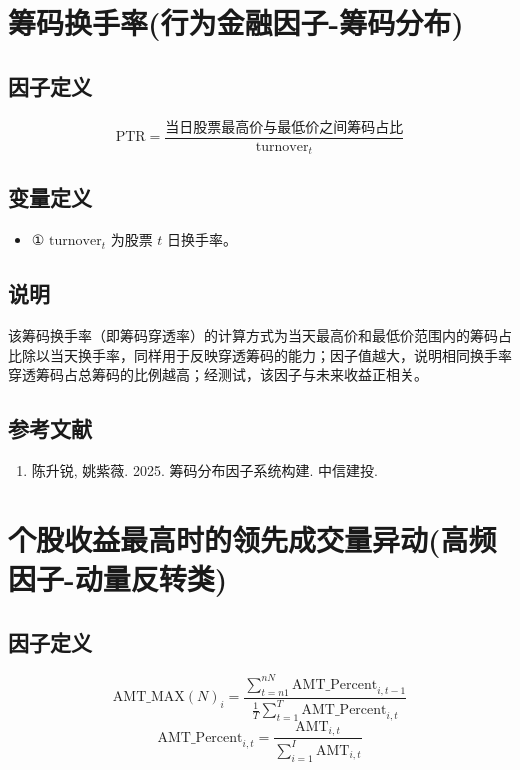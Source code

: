 \documentclass{article}
\begin{document}
\section{筹码换手率(行为金融因子-筹码分布)}

\subsection{因子定义}
\begin{equation}
    \mathrm{PTR} = \frac{\text{当日股票最高价与最低价之间筹码占比}}{\mathrm{turnover}_t}
\end{equation}

\subsection{变量定义}
\begin{itemize}
    \item ① \( \mathrm{turnover}_t \) 为股票 \( t \) 日换手率。
\end{itemize}

\subsection{说明}
该筹码换手率（即筹码穿透率）的计算方式为当天最高价和最低价范围内的筹码占比除以当天换手率，同样用于反映穿透筹码的能力；因子值越大，说明相同换手率穿透筹码占总筹码的比例越高；经测试，该因子与未来收益正相关。

\subsection{参考文献}
\begin{enumerate}
    \item 陈升锐, 姚紫薇. 2025. 筹码分布因子系统构建. 中信建投.
\end{enumerate}

\section{个股收益最高时的领先成交量异动(高频因子-动量反转类)}

\subsection{因子定义}

\begin{equation}
    \mathrm{AMT\_MAX}(N)_i = \frac{\sum_{t=n1}^{nN} \mathrm{AMT\_Percent}_{i,t-1}}{\frac{1}{T}\sum_{t=1}^{T} \mathrm{AMT\_Percent}_{i,t}}
\end{equation}
\begin{equation}
    \mathrm{AMT\_Percent}_{i,t} = \frac{\mathrm{AMT}_{i,t}}{\sum_{i=1}^{I} \mathrm{AMT}_{i,t}}
\end{equation}
\end{document}
